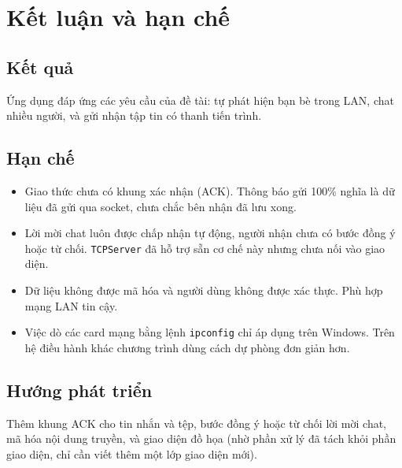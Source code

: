 \documentclass[a4paper,12pt]{article}
\newcommand{\code}[1]{\texttt{#1}}
\begin{document}
	\section{Kết luận và hạn chế}
	
	\subsection{Kết quả}
	Ứng dụng đáp ứng các yêu cầu của đề tài: tự phát hiện bạn bè trong LAN, chat nhiều người, và gửi nhận tập tin có thanh tiến trình.
	
	\subsection{Hạn chế}
	\begin{itemize}
		\item Giao thức chưa có khung xác nhận (ACK). Thông báo gửi 100\% nghĩa là dữ liệu đã gửi qua socket, chưa chắc bên nhận đã lưu xong.
		\item Lời mời chat luôn được chấp nhận tự động, người nhận chưa có bước đồng ý hoặc từ chối. \code{TCPServer} đã hỗ trợ sẵn cơ chế này nhưng chưa nối vào giao diện.
		\item Dữ liệu không được mã hóa và người dùng không được xác thực. Phù hợp mạng LAN tin cậy.
		\item Việc dò các card mạng bằng lệnh \code{ipconfig} chỉ áp dụng trên Windows. Trên hệ điều hành khác chương trình dùng cách dự phòng đơn giản hơn.
	\end{itemize}
	
	\subsection{Hướng phát triển}
	Thêm khung ACK cho tin nhắn và tệp, bước đồng ý hoặc từ chối lời mời chat, mã hóa nội dung truyền, và giao diện đồ họa (nhờ phần xử lý đã tách khỏi phần giao diện, chỉ cần viết thêm một lớp giao diện mới).
	
\end{document}
